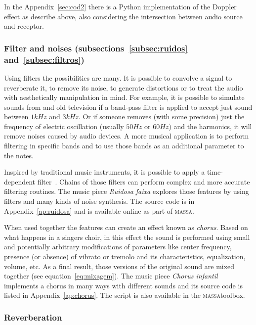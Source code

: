 \documentclass[
 aip,
 jmp,
 amsmath,amssymb,
 reprint,
]{revtex4-1}
\newcommand{\massa}{{\large \textsc{massa}}}
\begin{document}
In the Appendix~\ref{sec:cod2} there is a Python implementation of the Doppler
effect as describe above, also considering the intersection between audio source and receptor.


\subsubsection{Filter and noises (subsections~\ref{subsec:ruidos} and~\ref{subsec:filtros})}

Using filters the possibilities are many. It is possible to
convolve a signal to reverberate it, to remove its noise, to generate
distortions or to treat the audio with aesthetically manipulation in mind. For
example, it is possible to simulate sounds from and old television if a
band-pass filter is applied to accept just sound between $1kHz$ and $3kHz$. Or
if someone removes (with some precision) just the frequency of electric
oscillation (usually $50Hz$ or $60Hz$) and the harmonics, it will remove noises
caused by audio devices. A more musical application is to perform filtering in
specific bands and to use those bands as an additional parameter to the notes.

Inspired by traditional music instruments, it is possible to apply a
time-dependent filter~\cite{Roederer}. Chains of those filters can perform
complex and more accurate filtering routines. The music piece \emph{Ruidosa
faixa} explores those features by using filters and many kinds of noise
synthesis. The source code is in Appendix~\ref{ap:ruidosa} and is available
online as part of \massa.

When used together the features can create an effect known
as \emph{chorus}. Based on what happens in a singers choir, in this
effect the sound is performed using small and potentially arbitrary
modifications of parameters like center frequency, presence (or absence) of
vibrato or tremolo and its characteristics, equalization, volume, etc. As a
final result, those versions of the original sound are mixed together (see
equation~\ref{eq:mixagem}). The music piece \emph{Chorus infantil} implements a
chorus in many ways with different sounds and its source code is listed in
Appendix~\ref{ap:chorus}. The script is also available in the \massa toolbox.


\subsubsection{Reverberation}\label{subsubsec:reverb}
\end{document}

